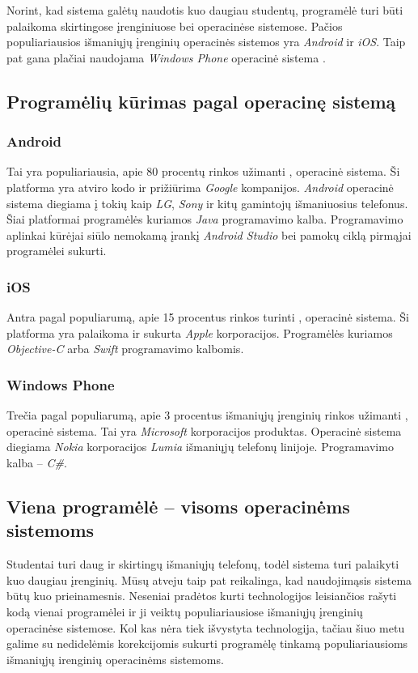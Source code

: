 \documentclass{VUMIFPSbakalaurinis}
\begin{document}
Norint, kad sistema galėtų naudotis kuo daugiau studentų, programėlė turi būti palaikoma skirtingose įrenginiuose bei operacinėse sistemose. Pačios populiariausios išmaniųjų įrenginių operacinės sistemos yra \textit{Android} ir \textit{iOS}. Taip pat gana plačiai naudojama \textit{Windows Phone} operacinė sistema \cite{MarketShareByOS}.

\subsection{Programėlių kūrimas pagal operacinę sistemą}

\subsubsection{Android}
Tai yra populiariausia, apie 80 procentų rinkos užimanti \cite{MarketShareByOS}, operacinė sistema. Ši platforma yra atviro kodo ir prižiūrima \textit{Google} kompanijos. \textit{Android} operacinė sistema diegiama į tokių kaip \textit{LG}, \textit{Sony} ir kitų gamintojų išmaniuosius telefonus. Šiai platformai programėlės kuriamos \textit{Java} programavimo kalba. Programavimo aplinkai kūrėjai siūlo nemokamą įrankį \textit{Android Studio} bei pamokų ciklą pirmąjai programėlei sukurti.

\subsubsection{iOS}
Antra pagal populiarumą, apie 15 procentus rinkos turinti \cite{MarketShareByOS}, operacinė sistema. Ši platforma yra palaikoma ir sukurta \textit{Apple} korporacijos. Programėlės kuriamos \textit{Objective-C} arba \textit{Swift} programavimo kalbomis.

\subsubsection{Windows Phone}

Trečia pagal populiarumą, apie 3 procentus išmaniųjų įrenginių rinkos užimanti \cite{MarketShareByOS}, operacinė sistema. Tai yra \textit{Microsoft} korporacijos produktas. Operacinė sistema diegiama \textit{Nokia} korporacijos \textit{Lumia} išmaniųjų telefonų linijoje. Programavimo kalba – \textit{C\#}.

\subsection{Viena programėlė – visoms operacinėms sistemoms}
Studentai turi daug ir skirtingų išmaniųjų telefonų, todėl sistema turi palaikyti kuo daugiau įrenginių. Mūsų atveju taip pat reikalinga, kad naudojimąsis sistema būtų kuo prieinamesnis. Neseniai pradėtos kurti technologijos leisiančios rašyti kodą vienai programėlei ir ji veiktų populiariausiose \cite{MarketShareByOS} išmaniųjų įrenginių operacinėse sistemose. Kol kas nėra tiek išvystyta technologija, tačiau šiuo metu galime su nedidelėmis korekcijomis sukurti programėlę tinkamą populiariausioms išmaniųjų irenginių operacinėms sistemoms.
\end{document}
